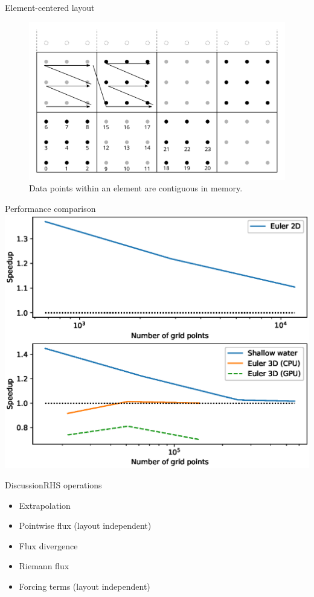 \documentclass{beamer}
\begin{document}
\begin{frame}{Element-centered layout}
\begin{figure}
    \includegraphics[scale=0.7]{img/elem_wise_layout}
    \caption{Data points within an element are contiguous in memory.}
\end{figure}
\end{frame}

\begin{frame}{Performance comparison}
    \includegraphics[scale=0.66]{img/layout_perf.eps}
\end{frame}

\begin{frame}{Discussion}{RHS operations}
\begin{itemize}
    \item Extrapolation
    \item Pointwise flux (layout independent)
    \item Flux divergence
    \item Riemann flux
    \item Forcing terms (layout independent)
\end{itemize}
\end{frame}
\end{document}
